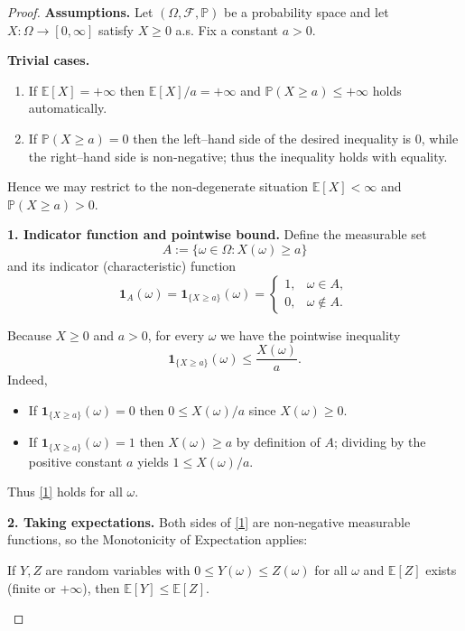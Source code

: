 \begin{proof}
\textbf{Assumptions.}  
Let \((\Omega,\mathcal F,\mathbb P)\) be a probability space and let
\(X:\Omega\to[0,\infty]\) satisfy \(X\ge 0\) a.s.  Fix a constant \(a>0\).

\medskip
\textbf{Trivial cases.}
\begin{enumerate}
\item If \(\mathbb{E}[X]=+\infty\) then \(\mathbb{E}[X]/a=+\infty\) and
\(\mathbb{P}(X\ge a)\le+\infty\) holds automatically.
\item If \(\mathbb{P}(X\ge a)=0\) then the left–hand side of the desired inequality is \(0\), while the right–hand side is non‑negative; thus the inequality holds with equality.
\end{enumerate}
Hence we may restrict to the non‑degenerate situation
\(\mathbb{E}[X]<\infty\) and \(\mathbb{P}(X\ge a)>0\).

\medskip
\textbf{1. Indicator function and pointwise bound.}  
Define the measurable set
\[
A:=\{\omega\in\Omega : X(\omega)\ge a\}
\]
and its indicator (characteristic) function
\[
\mathbf 1_{A}(\omega)=\mathbf 1_{\{X\ge a\}}(\omega)=
\begin{cases}
1, & \omega\in A,\\[2pt]
0, & \omega\notin A .
\end{cases}
\]

Because \(X\ge0\) and \(a>0\), for every \(\omega\) we have the pointwise inequality
\begin{equation}
\mathbf 1_{\{X\ge a\}}(\omega)\le \frac{X(\omega)}{a}.
\tag{1}
\end{equation}
Indeed,
\begin{itemize}
\item If \(\mathbf 1_{\{X\ge a\}}(\omega)=0\) then \(0\le X(\omega)/a\) since \(X(\omega)\ge0\).
\item If \(\mathbf 1_{\{X\ge a\}}(\omega)=1\) then \(X(\omega)\ge a\) by definition of \(A\); dividing by the positive constant \(a\) yields \(1\le X(\omega)/a\).
\end{itemize}
Thus \eqref{1} holds for all \(\omega\).

\medskip
\textbf{2. Taking expectations.}  
Both sides of \eqref{1} are non‑negative measurable functions, so the
Monotonicity of Expectation applies:

\begin{theorem}[Monotonicity]
If \(Y,Z\) are random variables with \(0\le Y(\omega)\le Z(\omega)\) for all \(\omega\) and \(\mathbb{E}[Z]\) exists (finite or \(+\infty\)), then \(\mathbb{E}[Y]\le\mathbb{E}[Z]\).
\end{theorem}


\end{proof}
